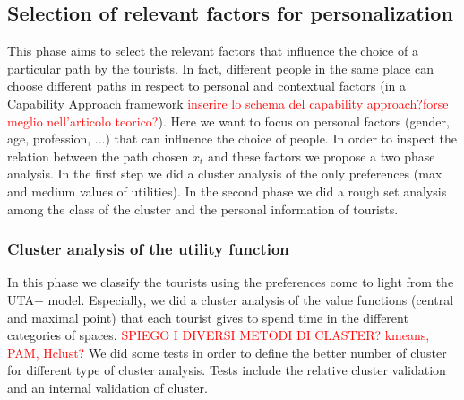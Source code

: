 \documentclass[a4paper]{article}
\begin{document}
\subsection{Selection of relevant factors for personalization}
This phase aims to select the relevant factors that influence the choice of a particular path by the tourists. In fact, different people in the same place can choose different paths in respect to personal and contextual factors (in a Capability Approach framework \textcolor{red}{inserire lo schema del capability approach?forse meglio nell'articolo teorico?}). Here we want to focus on personal factors (gender, age, profession, ...) that can influence the choice of people.
In order to inspect the relation between the path chosen $x_t$ and these factors we propose a two phase analysis. In the first step we did a cluster analysis of the only preferences (max and medium values of utilities). In the second phase we did a rough set analysis among the class of the cluster and the personal information of tourists.


\subsubsection{Cluster analysis of the utility function}
In this phase we classify the tourists using the preferences come to light from the UTA+ model. Especially, we did a cluster analysis of the value functions (central and maximal point) that each tourist gives to spend time in the different categories of spaces.
\textcolor{red}{SPIEGO I DIVERSI METODI DI CLASTER? kmeans, PAM, Hclust?}
We did some tests in order to define the better number of cluster for different type of cluster analysis. Tests include the relative cluster validation and an internal validation of cluster.
\end{document}
